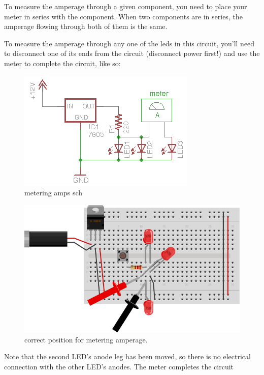 To measure the amperage through a given component, you need to place your meter in series with the component. When two components are in series, the amperage flowing through both of them is the same.

To measure the amperage through any one of the leds in this circuit, you'll need to disconnect one of its ends from the circuit (disconnect power first!) and use the meter to complete the circuit, like so:

\begin{figure}[!htb]
 \centering
 \includegraphics[scale=0.8]{img/electronics/metering_amps_sch.png}
 \caption{metering amps sch}
 \label{metering amps sch}
\end{figure}

\begin{figure}[!htb]
 \centering
 \includegraphics[scale=0.8]{img/electronics/breadboard_LED_parallel_meter.png}
 \caption{correct position for metering amperage.}
 \label{correct position for metering amperage.}
\end{figure}

Note that the second LED's anode leg has been moved, 
so there is no electrical connection with the other LED's anodes. 
The meter completes the circuit

